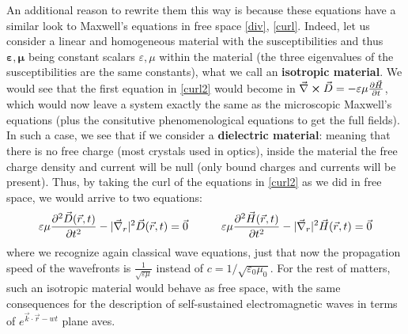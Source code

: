 \documentclass[11pt, a4paper, twoside]{article} %
\begin{document}
An additional reason to rewrite them this way is because these equations have a similar look to Maxwell's equations in free space \eqref{div}, \eqref{curl}. Indeed, let us consider a linear and homogeneous material with the susceptibilities and thus $\pmb{\varepsilon},\pmb{\mu}$ being constant scalars $\varepsilon,\mu$ within the material (the three eigenvalues of the susceptibilities are the same constants), what we call an {\bf isotropic material}. We would see that the first equation in \eqref{curl2} would become in $\vec{\nabla}\cross\vec{D}=-\varepsilon\mu\pdv{\vec{H}}{t}$, which would now leave a system exactly the same as the microscopic Maxwell's equations (plus the consitutive phenomenological equations to get the full fields). In such a case, we see that if we consider a {\bf dielectric material}: meaning that there is no free charge (most crystals used in optics), inside the material the free charge density and current will be null (only bound charges and currents will be present). Thus, by taking the curl of the equations in \eqref{curl2} as we did in free space, we would arrive to two equations:
\begin{equation}
\varepsilon\mu\pdv[2]{\vec{D}(\vec{r},t)}{t}-|\vec{\nabla}_r|^2\vec{D}(\vec{r},t)=\vec{0} \quad \quad \quad \varepsilon\mu\pdv[2]{\vec{H}(\vec{r},t)}{t}-|\vec{\nabla}_r|^2\vec{H}(\vec{r},t)=\vec{0}
\end{equation}
where we recognize again classical wave equations, just that now the propagation speed of the wavefronts is $\frac{1}{\sqrt{\varepsilon\mu}}$ instead of $c={1}/{\sqrt{\varepsilon_0\mu_0}}$. For the rest of matters, such an isotropic material would behave as free space, with the same consequences for the description of self-sustained electromagnetic waves in terms of $e^{\vec{k}\cdot\vec{r}-wt}$ plane aves.
\end{document}
